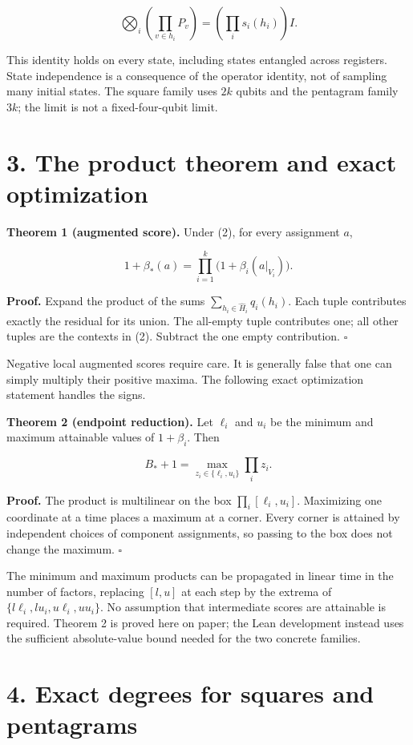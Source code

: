 \documentclass[10pt,a4paper]{article}
\begin{document}
\[\bigotimes_i\left(\prod_{v\in h_i}P_v\right)
=\left(\prod_i s_i(h_i)\right)I. \tag{5}\]

This identity holds on every state, including states entangled across registers. State independence is a consequence of the operator identity, not of sampling many initial states. The square family uses \(2k\) qubits and the pentagram family \(3k\); the limit is not a fixed-four-qubit limit.

\section{3. The product theorem and exact optimization}\label{the-product-theorem-and-exact-optimization}

\textbf{Theorem 1 (augmented score).} Under (2), for every assignment \(a\),

\[1+\beta_*(a)=\prod_{i=1}^k\bigl(1+\beta_i(a|_{V_i})\bigr). \tag{6}\]

\textbf{Proof.} Expand the product of the sums \(\sum_{h_i\in\widehat H_i}q_i(h_i)\). Each tuple contributes exactly the residual for its union. The all-empty tuple contributes one; all other tuples are the contexts in (2). Subtract the one empty contribution. \(\square\)

Negative local augmented scores require care. It is generally false that one can simply multiply their positive maxima. The following exact optimization statement handles the signs.

\textbf{Theorem 2 (endpoint reduction).} Let \(\ell_i\) and \(u_i\) be the minimum and maximum attainable values of \(1+\beta_i\). Then

\[B_*+1=\max_{z_i\in\{\ell_i,u_i\}}\prod_i z_i. \tag{7}\]

\textbf{Proof.} The product is multilinear on the box \(\prod_i[\ell_i,u_i]\). Maximizing one coordinate at a time places a maximum at a corner. Every corner is attained by independent choices of component assignments, so passing to the box does not change the maximum. \(\square\)

The minimum and maximum products can be propagated in linear time in the number of factors, replacing \([l,u]\) at each step by the extrema of \(\{l\ell_i,lu_i,u\ell_i,uu_i\}\). No assumption that intermediate scores are attainable is required. Theorem 2 is proved here on paper; the Lean development instead uses the sufficient absolute-value bound needed for the two concrete families.

\section{4. Exact degrees for squares and pentagrams}\label{exact-degrees-for-squares-and-pentagrams}
\end{document}
